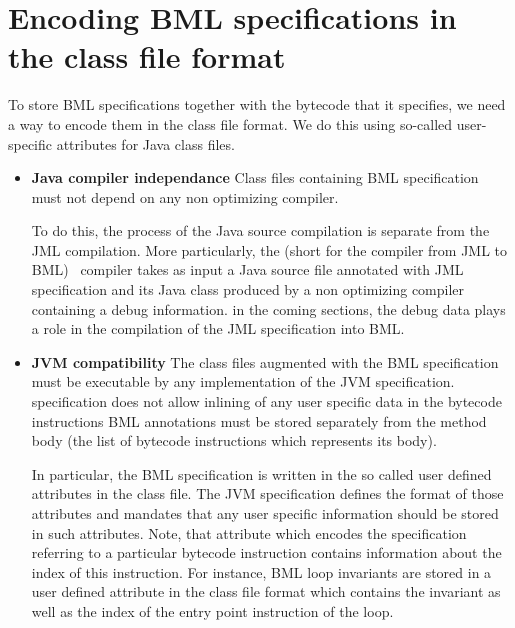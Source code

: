 \section{Encoding BML specifications in the class file format}
\label{SecClassfile}

To store BML specifications together with the bytecode that it
specifies, we need a way to encode them in the class file format. We
do this using so-called user-specific attributes for Java class files.

\begin{itemize}
\item \textbf{Java compiler independance } 
Class files containing BML specification must not depend on any non
optimizing compiler.
    
      To do this, the process of the Java source compilation is
      separate from the JML compilation. More particularly, the
      \JMLtoBML (short for the compiler from JML to BML) \ compiler
      takes as input a Java source file annotated with JML
      specification and its Java class produced by a non optimizing
      compiler containing a debug information.%
      in the coming sections, the debug data plays a role in the
      compilation of the JML specification into BML.
      

\item \textbf{JVM compatibility } 
            The class files augmented with the BML specification must
            be executable by any implementation of the JVM
            specification.  %
            specification does not allow inlining of any user specific
            data in the bytecode instructions BML annotations must be
            stored separately from the method body (the list of
            bytecode instructions which represents its body).
	  
	    

In particular, the BML specification is written in the so called user
defined attributes in the class file.  The JVM specification defines
the format of those attributes and mandates that any user specific
information should be stored in such attributes. Note, that attribute
which encodes the specification referring to a particular bytecode
instruction contains information about the index of this
instruction. For instance, BML loop invariants are stored in a user
defined attribute in the class file format which contains the
invariant as well as the index of the entry point instruction of the
loop.
	    

\end{itemize}
